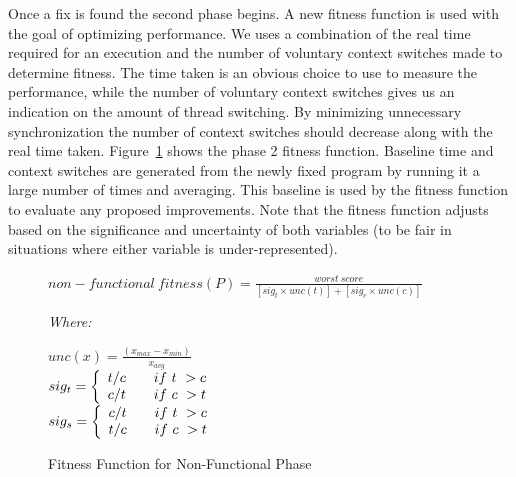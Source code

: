 \documentclass{llncs}
\begin{document}
Once a fix is found the second phase begins. A new fitness function is used
with the goal of optimizing performance. We uses a combination of the real time
required for an execution and the number of voluntary context switches made to
determine fitness. The time taken is an obvious choice to use to measure the
performance, while the number of voluntary context switches gives us an
indication on the amount of thread switching. By minimizing unnecessary
synchronization the number of context switches should decrease along with the
real time taken. Figure~\ref{fig:nonfunctional_fitness} shows the phase 2
fitness function. Baseline time and context switches are generated from the
newly fixed program by running it a large number of times and averaging. This
baseline is used by the fitness function to evaluate any proposed improvements.
Note that the fitness function adjusts based on the significance and
uncertainty of both variables (to be fair in situations where either variable
is under-represented).


\begin{figure}
\begin{footnotesize}
\begin{center}
$non-functional\ fitness(P) = \frac{worst\ score}{[sig_t \times unc(t)] + [sig_c \times unc(c)]}$
\end{center}
\vspace{0.1cm} \textit{Where:} \vspace{0.1cm}
\end{footnotesize}
\begin{tiny}
\begin{center}
$unc(x) = \frac{(x_{max} - x_{min})}{x_{avg}}$ \\ \vspace{0.2cm}
$
  sig_t = \left\{
  \begin{array}{l l}
    t/c & \quad if\ t\ > c \\
    c/t & \quad if\ c\ > t \\
  \end{array} \right.
$ \\ \vspace{0.2cm}
$
  sig_s = \left\{
  \begin{array}{l l}
    c/t & \quad if\ t\ > c \\
    t/c & \quad if\ c\ > t \\
  \end{array} \right.
$ \\
\end{center}
\end{tiny}
\caption{Fitness Function for Non-Functional Phase}
\label{fig:nonfunctional_fitness}
\end{figure}
\end{document}

